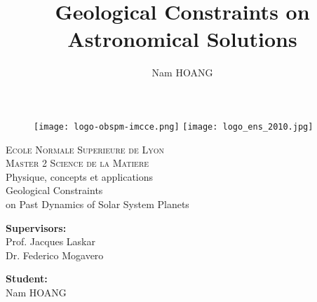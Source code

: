\documentclass[12pt]{article}
\title{Geological Constraints on Astronomical Solutions}
\author{Nam HOANG}
\begin{document}
	\begin{titlepage}
		\begin{figure}[t]
			\centering\texttt{[image: logo-obspm-imcce.png]}  \hfill
			\centering\texttt{[image: logo\_ens\_2010.jpg]}
		\end{figure}
		
		
		\begin{center}
			\textsc{ \LARGE{Ecole Normale Superieure de Lyon \\}}
			\textsc{ \LARGE{Master 2 Science de la Matiere\\ }}
			\textnormal{ \LARGE{Physique, concepts et applications\\}}
			\vspace{30mm}
			\fontsize{10mm}{7mm}\selectfont 
			\textup{Geological Constraints \\on Past Dynamics of Solar System Planets}\\
		\end{center}
		\vspace{75mm}
		
		
		\begin{minipage}[t]{0.47\textwidth}
			\textnormal{\large{\bf Supervisors:\\}}
			{\large Prof. Jacques Laskar\\ Dr. Federico Mogavero}
		\end{minipage}\hfill\begin{minipage}[t]{0.47\textwidth}\raggedleft
			\textnormal{\large{\bf Student:\\}}
			{\large Nam HOANG }
		\end{minipage}
		
		\vspace{25mm}
		
		
	\end{titlepage}
	
\end{document}
